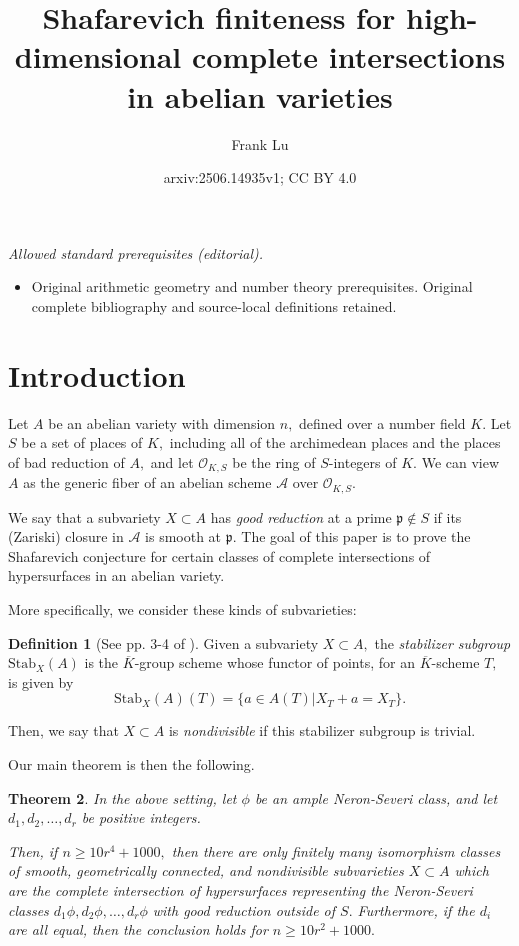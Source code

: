 \documentclass{article}
\title{Shafarevich finiteness for high-dimensional complete intersections in abelian varieties}
\author{Frank Lu}
\date{arxiv:2506.14935v1; CC BY 4.0}
\newtheorem{thm}{Theorem}[section]
\theoremstyle{definition}
\newtheorem{defn}[thm]{Definition}
\theoremstyle{remark}
\begin{document}
\maketitle
\noindent\textit{Allowed standard prerequisites (editorial).}\begin{itemize}
\item Original arithmetic geometry and number theory prerequisites. Original complete bibliography and source-local definitions retained.
\end{itemize}\medskip
\section{Introduction}
Let $A$ be an abelian variety with dimension $n,$ defined over a number field $K.$ Let $S$ be a set of places of $K,$ including all of the archimedean places and the places of bad reduction of $A,$ and let $\mathcal{O}_{K, S}$ be the ring of $S$-integers of $K.$ We can view $A$ as the generic fiber of an abelian scheme $\mathcal{A}$ over $\mathcal{O}_{K, S}.$ 
\par We say that a subvariety $X \subset A$ has \textit{good reduction} at a prime $\mathfrak{p} \not \in S$ if its (Zariski) closure in $\mathcal{A}$ is smooth at $\mathfrak{p}.$ The goal of this paper is to prove the Shafarevich conjecture for certain classes of complete intersections of hypersurfaces in an abelian variety.
\par More specifically, we consider these kinds of subvarieties:
\begin{defn}[See pp. 3-4 of \cite{km24}]
Given a subvariety $X \subset A,$ the \textit{stabilizer subgroup} $\text{Stab}_X(A)$ is the $\overline{K}$-group scheme whose functor of points, for an $\overline{K}$-scheme $T,$ is given by \[\text{Stab}_X(A)(T) = \{a \in A(T)|X_T + a= X_T\}.\]
\par Then, we say that $X \subset A$ is \textit{nondivisible} if this stabilizer subgroup is trivial.
\end{defn}
\par Our main theorem is then the following.

\begin{thm}\label{thm: main theorem}
In the above setting, let $\phi$ be an ample Neron-Severi class, and let $d_1, d_2, \ldots, d_r$ be positive integers. 
\par Then, if $n \geq 10r^4 + 1000,$ then there are only finitely many isomorphism classes of smooth, geometrically connected, and nondivisible subvarieties $X \subset A$ which are the complete intersection of hypersurfaces representing the Neron-Severi classes $d_1\phi, d_2\phi, \ldots, d_r\phi$ with good reduction outside of $S.$ Furthermore, if the $d_i$ are all equal, then the conclusion holds for $n \geq 10r^2 + 1000.$
\end{thm}
\end{document}
